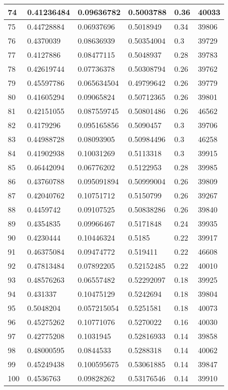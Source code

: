 \begin{longtable}{|l|l|l|l|l|l|}
74 & 0.41236484 & 0.09636782 & 0.5003788 & 0.36 & 40033 \\ \hline 
75 & 0.44728884 & 0.06937696 & 0.5018949 & 0.34 & 39806 \\ \hline 
76 & 0.4370039 & 0.08636939 & 0.50354004 & 0.3 & 39729 \\ \hline 
77 & 0.4127886 & 0.08477115 & 0.5048937 & 0.28 & 39783 \\ \hline 
78 & 0.42619744 & 0.07736378 & 0.50308794 & 0.26 & 39762 \\ \hline 
79 & 0.45597786 & 0.065634504 & 0.49799642 & 0.26 & 39779 \\ \hline 
80 & 0.41605294 & 0.09065824 & 0.50712365 & 0.26 & 39801 \\ \hline 
81 & 0.42151055 & 0.087559745 & 0.50801486 & 0.26 & 46562 \\ \hline 
82 & 0.4179296 & 0.095165856 & 0.5090457 & 0.3 & 39706 \\ \hline 
83 & 0.44988728 & 0.08093905 & 0.50984496 & 0.3 & 46258 \\ \hline 
84 & 0.41902938 & 0.10031269 & 0.5113318 & 0.3 & 39915 \\ \hline 
85 & 0.46442094 & 0.06776202 & 0.5122953 & 0.28 & 39985 \\ \hline 
86 & 0.43760788 & 0.095091894 & 0.50999004 & 0.26 & 39809 \\ \hline 
87 & 0.42040762 & 0.10751712 & 0.5150799 & 0.26 & 39267 \\ \hline 
88 & 0.4459742 & 0.09107525 & 0.50838286 & 0.26 & 39840 \\ \hline 
89 & 0.4354835 & 0.09966467 & 0.5171848 & 0.24 & 39935 \\ \hline 
90 & 0.4230444 & 0.10446324 & 0.5185 & 0.22 & 39917 \\ \hline 
91 & 0.46375084 & 0.09474772 & 0.519411 & 0.22 & 46608 \\ \hline 
92 & 0.47813484 & 0.07892205 & 0.52152485 & 0.22 & 40010 \\ \hline 
93 & 0.48576263 & 0.06557482 & 0.52292097 & 0.18 & 39925 \\ \hline 
94 & 0.431337 & 0.10475129 & 0.5242694 & 0.18 & 39804 \\ \hline 
95 & 0.5048204 & 0.057215054 & 0.5251581 & 0.18 & 40073 \\ \hline 
96 & 0.45275262 & 0.10771076 & 0.5270022 & 0.16 & 40030 \\ \hline 
97 & 0.42775208 & 0.1031945 & 0.52816933 & 0.14 & 39858 \\ \hline 
98 & 0.48000595 & 0.0844533 & 0.5288318 & 0.14 & 40062 \\ \hline 
99 & 0.45249438 & 0.100595675 & 0.53061885 & 0.14 & 39847 \\ \hline 
100 & 0.4536763 & 0.09828262 & 0.53176546 & 0.14 & 39910 \\ \hline 
\end{longtable}